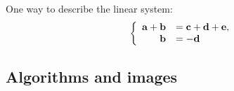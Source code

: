 \documentclass{article}
\begin{document}
One way to describe the linear system:
\begin{equation} \label{eq:linear_system_example}
\left\{
\begin{array} {r l}
\mathbf{a} + \mathbf{b} & = \mathbf{c} + \mathbf{d} +\mathbf{e} , \\
\mathbf{b} & = -\mathbf{d}
\end{array}
\right.
\end{equation}


\subsection{Algorithms and images} \label{sec:algorithms_images}

\end{document}
